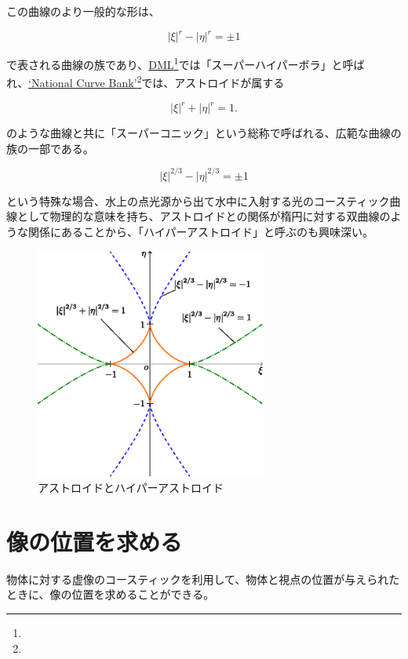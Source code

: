 \documentclass[twocolumn]{article}
\begin{document}
	この曲線のより一般的な形は、
	
	$$ \left| \xi \right|^{r} - \left| \eta \right|^{r} = \pm1 $$
	
	で表される曲線の族であり、\href{http://dynamicmathematicslearning.com/super-ellipse.html}{DML}\footnote{}では「スーパーハイパーボラ」と呼ばれ、\href{https://old.nationalcurvebank.org/superconicncb/superconicncbb.htm}{`National Curve Bank'}\footnote{}では、アストロイドが属する
	
	$$ \left| \xi \right|^{r} + \left| \eta \right|^{r} = 1. $$
	
	のような曲線と共に「スーパーコニック」という総称で呼ばれる、広範な曲線の族の一部である。
	
	$$ \left| \xi \right|^{2/3} - \left| \eta \right|^{2/3} = \pm1 $$
	
	という特殊な場合、水上の点光源から出て水中に入射する光のコースティック曲線として物理的な意味を持ち、アストロイドとの関係が楕円に対する双曲線のような関係にあることから、「ハイパーアストロイド」と呼ぶのも興味深い。
	
	\begin{figure}
		\centering
		\includegraphics[width=3in]{figs/g254.eps}
		\caption{アストロイドとハイパーアストロイド}
		\label{fig:hyperastroid}
	\end{figure}
	
	\section{像の位置を求める}
	
	物体に対する虚像のコースティックを利用して、物体と視点の位置が与えられたときに、像の位置を求めることができる。
	
\end{document}
